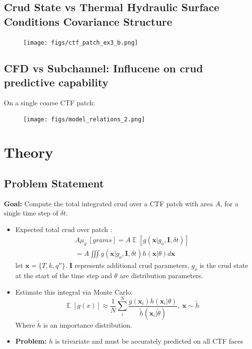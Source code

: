 \documentclass[t, pdftex]{beamer}
\DeclareMathOperator*{\E}{\mathbb{E}}
\begin{document}
\subsection*{Crud State vs Thermal Hydraulic Surface Conditions Covariance Structure}
\begin{frame}
\begin{figure}[]
\vspace{-16.5pt}
\centering
\texttt{[image: figs/ctf\_patch\_ex3\_b.png]}
\label{model_overview}
\end{figure}
\end{frame}

\subsection*{CFD vs Subchannel:  Influcene on crud predictive capability}
\begin{frame}
On a single coarse CTF patch:
\vspace{-6.5pt}
\begin{figure}[!htbp]
\centering
\texttt{[image: figs/model\_relations\_2.png]}
\label{model_overview}
\end{figure}
\end{frame}

\section[Theory]{Theory}
\subsection*{Problem Statement}
\begin{frame}
\textbf{Goal:} Compute the total integrated crud over a CTF patch with area $A$, for a single time step of $\delta t$.
\begin{itemize}
	\item Expected total crud over patch : 
	\begin{eqnarray}
		A \mu_g\ [grams] = A \E[g(\mathbf x|g_o, \mathbf I, \delta t)] \nonumber \\
		= A \iiint g(\mathbf x|g_o, \mathbf I, \delta t) h(\mathbf x|\theta) d \mathbf x  \nonumber
	\end{eqnarray}
	let $\mathbf x= \{T, k, q''\}$.
	$\mathbf I$ represents additional crud parameters, $g_o$ is the crud state at the start of the time step and $\theta$ are distribution parameters.
	\item Estimate this integral via Monte Carlo:
	\[
	\E[g(x)] \approx \frac{1}{N} \sum_i^N \frac{g(\mathbf x_i) 
	h(\mathbf x_i | \theta)}{\tilde h(\mathbf x_i | \tilde \theta)}, \ \mathbf x \sim \tilde h
	\]
	Where $\tilde h$ is an importance distribution. 
    \item \textbf{Problem:} $h$ is trivariate and must be accurately predicted on all CTF faces
\end{itemize}
\end{frame}
\end{document}
